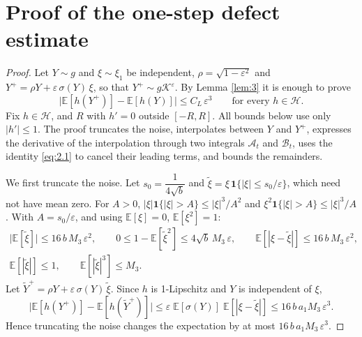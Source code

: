 \documentclass[aip,jmp,preprint,onecolumn,floatfix,superscriptaddress,nofootinbib,11pt]{revtex4-2}
\theoremstyle{plain}
\theoremstyle{remark}
\numberwithin{equation}{section}
\newcommand{\E}{\mathbb{E}}
\newcommand{\eps}{\varepsilon}
\begin{document}
 
\appendix
 
\section{Proof of the one-step defect estimate}\label{app:defect}
 
\begin{proof} Let $Y\sim g$ and $\xi\sim\xi_1$ be independent, $\rho=\sqrt{1-\eps^{2}}$ and $Y^{+}=\rho Y+\eps\,\sigma(Y)\,\xi$, so that $Y^{+}\sim g\mathcal K^{\eps}$. By Lemma \ref{lem:3} it is enough to prove
%
\begin{equation*}
\big|\E[h(Y^{+})]-\E[h(Y)]\big|\le C_L\,\eps^{3}\qquad\text{for every }h\in\mathcal H.
\end{equation*}
%
Fix $h\in\mathcal H$, and $R$ with $h'=0$ outside $[-R,R]$. All bounds below use only $|h'|\le1$. The proof truncates the noise, interpolates between $Y$ and $Y^{+}$, expresses the derivative of the interpolation through two integrals $\mathcal A_t$ and $\mathcal B_t$, uses the identity \eqref{eq:2.1} to cancel their leading terms, and bounds the remainders.
 
We first truncate the noise. Let $s_0=\dfrac{1}{4\sqrt b}$ and $\tilde\xi=\xi\,\mathbf 1\{|\xi|\le s_0/\eps\}$, which need not have mean zero. For $A>0$, $|\xi|\mathbf 1\{|\xi|>A\}\le|\xi|^{3}/A^{2}$ and $\xi^{2}\mathbf 1\{|\xi|>A\}\le|\xi|^{3}/A$. With $A=s_0/\eps$, and using $\E[\xi]=0$, $\E[\xi^{2}]=1$:
%
\begin{equation}
\begin{gathered} \big|\E[\tilde\xi]\big|\le16\,b\,M_3\,\eps^{2},\qquad 0\le1-\E[\tilde\xi^{2}]\le4\sqrt b\,M_3\,\eps,\qquad \E[|\xi-\tilde\xi|]\le16\,b\,M_3\,\eps^{2},\\[4pt] \E[|\tilde\xi|]\le1,\qquad \E[|\tilde\xi|^{3}]\le M_3 . \end{gathered}
\label{eq:4.8}
\end{equation}
%
Let $\tilde Y^{+}=\rho Y+\eps\,\sigma(Y)\,\tilde\xi$. Since $h$ is 1-Lipschitz and $Y$ is independent of $\xi$,
%
\begin{equation}
\big|\E[h(Y^{+})]-\E[h(\tilde Y^{+})]\big|\le\eps\;\E[\sigma(Y)]\;\E[|\xi-\tilde\xi|]\le16\,b\,a_1M_3\,\eps^{3}.
\label{eq:4.9}
\end{equation}
%
Hence truncating the noise changes the expectation by at most $16\,b\,a_1M_3\,\eps^{3}$.
 

\end{proof}
\end{document}
